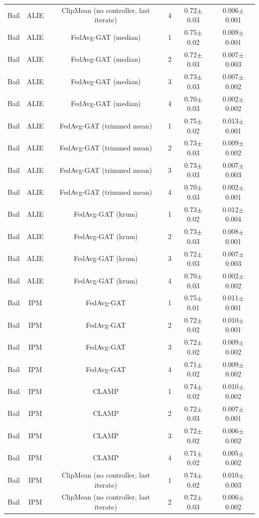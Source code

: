 \begin{table}[tbp]
\begin{tabular}{lccccc}
Bail & ALIE & ClipMean (no controller, last iterate) & 4 & 0.72$\pm$0.03 & 0.006$\pm$0.001 \\
Bail & ALIE & FedAvg-GAT (median) & 1 & 0.75$\pm$0.02 & 0.009$\pm$0.001 \\
Bail & ALIE & FedAvg-GAT (median) & 2 & 0.72$\pm$0.03 & 0.007$\pm$0.003 \\
Bail & ALIE & FedAvg-GAT (median) & 3 & 0.73$\pm$0.03 & 0.007$\pm$0.002 \\
Bail & ALIE & FedAvg-GAT (median) & 4 & 0.70$\pm$0.03 & 0.002$\pm$0.002 \\
Bail & ALIE & FedAvg-GAT (trimmed mean) & 1 & 0.75$\pm$0.02 & 0.013$\pm$0.001 \\
Bail & ALIE & FedAvg-GAT (trimmed mean) & 2 & 0.73$\pm$0.03 & 0.009$\pm$0.002 \\
Bail & ALIE & FedAvg-GAT (trimmed mean) & 3 & 0.73$\pm$0.03 & 0.007$\pm$0.003 \\
Bail & ALIE & FedAvg-GAT (trimmed mean) & 4 & 0.70$\pm$0.03 & 0.002$\pm$0.001 \\
Bail & ALIE & FedAvg-GAT (krum) & 1 & 0.73$\pm$0.02 & 0.012$\pm$0.004 \\
Bail & ALIE & FedAvg-GAT (krum) & 2 & 0.73$\pm$0.03 & 0.008$\pm$0.001 \\
Bail & ALIE & FedAvg-GAT (krum) & 3 & 0.72$\pm$0.03 & 0.007$\pm$0.003 \\
Bail & ALIE & FedAvg-GAT (krum) & 4 & 0.70$\pm$0.03 & 0.002$\pm$0.002 \\
Bail & IPM & FedAvg-GAT & 1 & 0.75$\pm$0.01 & 0.011$\pm$0.001 \\
Bail & IPM & FedAvg-GAT & 2 & 0.72$\pm$0.02 & 0.010$\pm$0.001 \\
Bail & IPM & FedAvg-GAT & 3 & 0.72$\pm$0.02 & 0.009$\pm$0.002 \\
Bail & IPM & FedAvg-GAT & 4 & 0.71$\pm$0.02 & 0.009$\pm$0.002 \\
Bail & IPM & CLAMP & 1 & 0.74$\pm$0.02 & 0.010$\pm$0.002 \\
Bail & IPM & CLAMP & 2 & 0.72$\pm$0.03 & 0.007$\pm$0.001 \\
Bail & IPM & CLAMP & 3 & 0.72$\pm$0.02 & 0.006$\pm$0.002 \\
Bail & IPM & CLAMP & 4 & 0.71$\pm$0.02 & 0.005$\pm$0.002 \\
Bail & IPM & ClipMean (no controller, last iterate) & 1 & 0.74$\pm$0.02 & 0.010$\pm$0.003 \\
Bail & IPM & ClipMean (no controller, last iterate) & 2 & 0.72$\pm$0.03 & 0.006$\pm$0.002 \\

\end{tabular}
\end{table}
